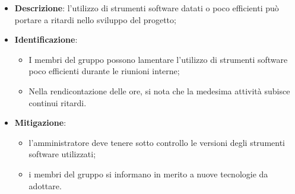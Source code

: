 \label{risk:strumenti software inadeguati}
\begin{itemize}
	\item \textbf{Descrizione}: l'utilizzo di strumenti software datati o poco
	      efficienti può portare a ritardi nello sviluppo del progetto;

	\item \textbf{Identificazione}:
	      \begin{itemize}
		      \item I membri del gruppo possono lamentare l'utilizzo di strumenti
		            software poco efficienti durante le riunioni interne;
		      \item Nella rendicontazione delle ore, si nota che la medesima
		            attività subisce continui ritardi.
	      \end{itemize}

	\item \textbf{Mitigazione}:
	      \begin{itemize}
		      \item l'amministratore deve tenere sotto controllo le versioni
		            degli strumenti software utilizzati;

		      \item i membri del gruppo si informano in merito a nuove
		            tecnologie da adottare.
	      \end{itemize}
\end{itemize}
